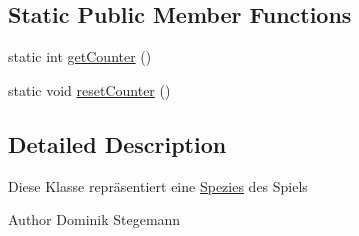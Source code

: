 \subsection*{Static Public Member Functions}
\begin{DoxyCompactItemize}
\item 
static int \hyperlink{classde_1_1gameoflife_1_1models_1_1Spezies_aa35467bec84ff93292a20f2cedcfd07d}{get\-Counter} ()
\item 
static void \hyperlink{classde_1_1gameoflife_1_1models_1_1Spezies_a5072b99cad8e5fec4791e0cbb211f18e}{reset\-Counter} ()
\end{DoxyCompactItemize}


\subsection{Detailed Description}
Diese Klasse repräsentiert eine \hyperlink{classde_1_1gameoflife_1_1models_1_1Spezies}{Spezies} des Spiels

\begin{DoxyAuthor}{Author}
Dominik Stegemann 
\end{DoxyAuthor}


